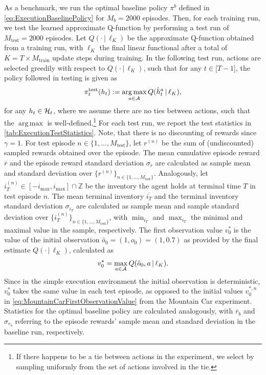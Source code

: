 \documentclass[
    a4paper,
    11pt,
    bibliography=totoc,
    listof=totoc,      
    headinclude=true,
    cleardoublepage=empty,
]{scrbook}
\theoremstyle{plain}
\theoremstyle{definition}
\theoremstyle{remark}
\newcommand{\SetZ}{\mathbb Z}
\newcommand{\SpaceA}{{\cal A}}
\newcommand{\SpaceH}{{\cal H}}
\DeclareMathOperator*{\argmax}{arg\,max}
\begin{document}
As a benchmark, we run the optimal baseline policy $\pi^b$ defined in 
\cref{eq:ExecutionBaselinePolicy} for $M_b=2000$ episodes. Then, for each 
training run, we test the learned approximate Q-function by performing a test 
run of $M_\text{test} = 2000$ episodes. Let $Q(\cdot \,|\,\ell_K)$ be the 
approximate Q-function obtained from a training run, with $\ell_K$ the final 
linear functional after a total of $K=T\times M_\text{train}$ update steps 
during training. In the following test run, actions are selected greedily with 
respect to $Q(\cdot\,|\,\ell_K)$, such that for any $t\in[T-1$], the policy 
followed in testing is given as
\begin{equation}
\label{eq:ExecutionTestPolicy}
    \pi^{\text{test}}_t(h_t) 
    := \argmax_{a\in\SpaceA} Q(\hat{h}_t^a\,|\,\ell_K),
\end{equation}
for any $h_t\in\SpaceH_t$, where we assume there are no ties between
actions, such that the $\argmax$ is well-defined.\footnote{
    If there happens to be a tie between actions in the experiment, we select 
    by sampling uniformly from the set of actions involved in the tie.
} 
For each test run, we report the test statistics in
\cref{tab:ExecutionTestStatistics}. Note, that there is no discounting of
rewards since $\gamma=1$. For test episode $n \in \{1,\dots, M_\text{test}\}$, let 
$r^{(n)}$ be the sum of (undiscounted) sampled rewards obtained over the 
episode. The mean cumulative episode reward $\overline{r}$ and the episode reward 
standard deviation $\sigma_r$ are calculated as sample mean and standard 
deviation over $\{r^{(n)}\}_{n \in \{1,\dots,M_\text{test}\}}$. Analogously, let 
$i^{(n)}_T\in[-i_{\max}, i_{\max}]\cap\SetZ$ be the inventory the agent 
holds at terminal time $T$ in test episode $n$. The mean terminal inventory 
$\overline{i_T}$ and the terminal inventory standard deviation $\sigma_{i_T}$ are 
calculated as sample mean and sample standard deviation over 
$\{i^{(n)}_T\}_{n \in \{1,\dots,M_\text{test}\}}$, with $\min_{i_T}$ and $\max_{i_T}$ 
the minimal and maximal value in the sample, respectively. The first 
observation value $v^*_0$ is the value of the initial observation $\hat{o}_0 = 
(1,o_0) = (1, 0.7)$ as provided by the final estimate $Q(\cdot\,|\, \ell_K)$, 
calculated as
\begin{equation}
\label{eq:ExecutionFirstObservationValue}
    v^*_0
    = \max_{a\in\SpaceA} Q(\hat{o}_0, a\,|\,\ell_K).
\end{equation}
Since in the simple execution environment the initial observation is 
deterministic, $v_0^*$ takes the same value in each test episode, as opposed 
to the initial values $v_0^{*,n}$ in 
\eqref{eq:MountainCarFirstObservationValue} from the Mountain Car experiment. 
Statistics for the optimal baseline policy are calculated analogously, with 
$\overline r_b$ and $\sigma_{r_b}$ referring to the episode rewards' sample mean 
and standard deviation in the baseline run, respectively.
\end{document}
